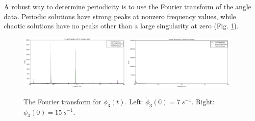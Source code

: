 \documentclass{article}
\begin{document}
A robust way to determine periodicity is to use the Fourier transform of the 
angle data. Periodic solutions have strong peaks at nonzero frequency values,
while chaotic solutions have no peaks other than a large singularity at zero 
(Fig. \ref{fig:fft}).

\begin{figure}[hbt]
    \centering
    \includegraphics[width=0.49\textwidth]{fft_periodic}
    \includegraphics[width=0.49\textwidth]{fft_chaotic}
    \caption{The Fourier transform for $\phi_3(t)$.
        Left: $\dot\phi_3(0) = \SI{7}{s^{-1}}$.
        Right: $\dot\phi_3(0) = \SI{15}{s^{-1}}$. }
    \label{fig:fft}
\end{figure}
\end{document}
